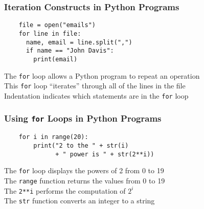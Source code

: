 \documentclass[14pt,aspectratio=169]{beamer}
\begin{document}
%
\begin{frame}[fragile]
  \frametitle{Iteration Constructs in Python Programs}
  \normalsize
  \hspace*{-.65in}
  \begin{minipage}{6in}
    \vspace*{.25in}
    \begin{verbatim}
    file = open("emails")
    for line in file:
      name, email = line.split(",")
      if name == "John Davis":
        print(email)
    \end{verbatim}
  \end{minipage}
  \vspace*{.25in}
  \begin{center}
    \normalsize \noindent The {\tt for} loop allows a Python program to repeat an operation \\
    \normalsize \noindent This {\tt for} loop ``iterates'' through all of the lines in the file \\
    \normalsize \noindent Indentation indicates which statements are in the {\tt for} loop \\
  \end{center}
\end{frame}

%
\begin{frame}[fragile]
  \frametitle{Using {\tt for} Loops in Python Programs}
  \normalsize
  \hspace*{-.65in}
  \begin{minipage}{6in}
    \vspace*{.25in}
    \begin{verbatim}
    for i in range(20):
        print("2 to the " + str(i)
              + " power is " + str(2**i))
    \end{verbatim}
  \end{minipage}
  \vspace*{.25in}
  \begin{center}
    \normalsize \noindent The {\tt for} loop displays the powers of 2 from 0 to 19 \\
    \normalsize \noindent The {\tt range} function returns the values from 0 to 19 \\
    \normalsize \noindent The {\tt 2**i} performs the computation of $2^i$ \\
    \normalsize \noindent The {\tt str} function converts an integer to a string \\
  \end{center}
\end{frame}
\end{document}
